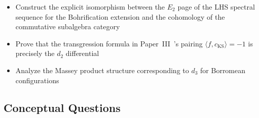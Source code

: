 \documentclass[11pt]{article}
\providecommand{\tightlist}{%
  \setlength{\itemsep}{0pt}\setlength{\parskip}{0pt}}
\begin{document}
\begin{enumerate}
  \begin{itemize}
  \tightlist
  \item
    Construct the explicit isomorphism between the \(E_2\) page of the LHS spectral sequence for the Bohrification extension and the cohomology of the commutative subalgebra category
  \item
    Prove that the transgression formula in Paper~III~\cite{PaperIII}'s pairing \(\langle f, c_{\text{KS}} \rangle = -1\) is precisely the \(d_2\) differential
  \item
    Analyze the Massey product structure corresponding to \(d_3\) for Borromean configurations
  \end{itemize}
\end{enumerate}

\subsection{Conceptual Questions}
\label{sec:octonions}
\end{document}
